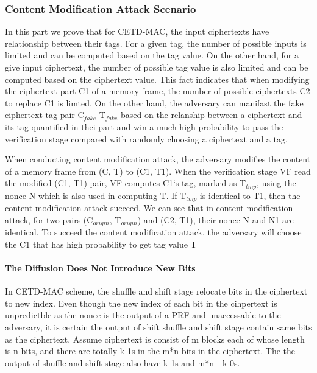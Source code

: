 \subsubsection{Content Modification Attack Scenario}
In this part we prove that for CETD-MAC, the input ciphertexts have relationship between their tags.  For a given tag, the number of possible inputs is limited and can be computed based on the tag value. On the other hand, for a give input ciphertext, the number of possible tag value is also limited and can be computed based on the ciphertext value. This fact indicates that when modifying the ciphertext part C1 of a memory frame, the number of possible ciphertexts C2 to replace C1 is limted. On the other hand, the adversary can manifast the fake ciphertext-tag pair C$_{fake}$-T$_{fake}$ based on the relanship between a ciphertext and its tag quantified in thei part and win a much high probability to pass the verification stage compared with randomly choosing a ciphertext and a tag. 

When conducting content modification attack, the adversary modifies the content of a memory frame from (C, T) to (C1, T1). When the verification stage VF read the modified (C1, T1) pair, VF computes C1`s tag, marked as T$_{tmp}$, using the nonce N which is also used in computing T. If T$_{tmp}$ is identical to T1, then the content modification attack succeed. We can see that in content modification attack, for two pairs (C$_{origin}$, T$_{origin}$) and (C2, T1), their nonce N and N1 are identical. To succeed the content modification attack, the adversary will choose the C1 that has high probability to get tag value T    
\paragraph{The Diffusion Does Not Introduce New Bits}
In CETD-MAC scheme, the shuffle and shift stage relocate bits in the ciphertext to new index. Even though the new index of each bit in the cihpertext is unpredictble as the nonce is the output of a PRF and unaccessable to the adversary, it is certain the output of shift shuffle and shift stage contain same bits as the ciphertext. Assume ciphertext is consist of m blocks each of whose length is n bits, and there are totally k 1s in the m*n bits in the ciphertext. The the output of shuffle and shift stage also have k 1s and m*n - k 0s. 

